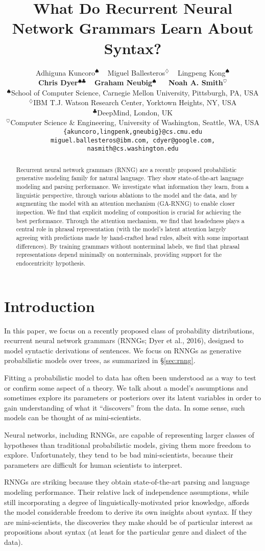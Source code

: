 \documentclass[11pt]{article}
\title{What Do Recurrent Neural Network Grammars Learn About Syntax?}
\author{Adhiguna Kuncoro$^{\spadesuit}$ ~ Miguel Ballesteros$^{\diamondsuit}$  ~ Lingpeng Kong$^{\spadesuit}$  \\ 
\textbf{Chris Dyer}$^{\spadesuit\clubsuit}$ ~ \textbf{Graham Neubig}$^{\spadesuit}$ ~~ \textbf{Noah A. Smith}$^{\heartsuit}$ \\
$^{\spadesuit}$School of Computer Science, Carnegie Mellon University, Pittsburgh, PA, USA \\
$^{\diamondsuit}$IBM T.J. Watson Research Center, Yorktown Heights, NY, USA \\
$^{\clubsuit}$DeepMind, London, UK\\
$^{\heartsuit}$Computer Science \& Engineering, University of Washington, Seattle, WA, USA\\
{\small \tt \{akuncoro,lingpenk,gneubig\}@cs.cmu.edu}\\ {\small \tt miguel.ballesteros@ibm.com, cdyer@google.com, nasmith@cs.washington.edu}
}
\date{}
\begin{document}
\maketitle
\begin{abstract}
Recurrent neural network grammars (RNNG) are a recently proposed probabilistic generative modeling family for natural language. They show state-of-the-art language modeling and parsing performance. We investigate what information they learn, from a linguistic perspective, through various ablations to the model and the data, and by augmenting the model with an attention mechanism (GA-RNNG) to enable closer inspection. We find that explicit modeling of composition is crucial for achieving the best performance. Through the attention mechanism, we find that headedness plays a central role in phrasal representation (with the model's latent attention largely agreeing with predictions made by hand-crafted head rules, albeit with some important differences). By training grammars without nonterminal labels, we find that phrasal representations depend minimally on nonterminals, providing support for the endocentricity hypothesis. 
\end{abstract}

\section{Introduction}


In this paper, we focus on a recently proposed class of probability distributions,
recurrent neural network grammars (RNNGs; \nocite{rnng} Dyer et al., 2016), designed to model syntactic derivations of sentences.  We focus on RNNGs as generative probabilistic models over trees, as summarized in \S\ref{sec:rnng}.

Fitting a probabilistic model to data has often been understood as a way to test or confirm some aspect of a theory.  We talk about a model's assumptions and sometimes explore its parameters or posteriors over its latent variables in order to gain understanding of what it ``discovers'' from the data.  In some sense,  such models can be thought of as mini-scientists.

Neural networks, including RNNGs, are capable of representing larger classes of hypotheses than traditional probabilistic models, giving them more freedom to explore.  Unfortunately, they tend to be bad mini-scientists, because their parameters are difficult for human scientists to interpret.

RNNGs are striking because they obtain state-of-the-art parsing and language modeling performance.  Their relative lack of independence assumptions, while still incorporating a degree of linguistically-motivated prior knowledge, affords the model considerable freedom to derive its own insights about syntax. If they are mini-scientists, the discoveries they make should be of particular interest as propositions about syntax (at least for the particular genre and dialect of the data).
\end{document}
